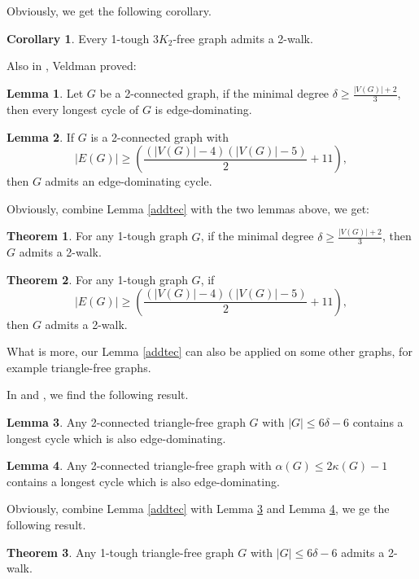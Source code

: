 \documentclass{amsart}
\theoremstyle{definition}
\newtheorem{theorem}{Theorem}
\newtheorem{corollary}{Corollary}
\newtheorem{lemma}{Lemma}
\begin{document}
Obviously, we get the following corollary.
\begin{corollary}
Every 1-tough $3K_2$-free graph admits a 2-walk.
\end{corollary}

Also in \cite{veldman83}, Veldman proved:

\begin{lemma}\label{lemdelta}{\cite[Theorem C]{veldman83}}
Let $G$ be a 2-connected graph, if the minimal degree $\delta\ge\frac{|V(G)|+2}{3}$, then every longest cycle of $G$ is edge-dominating.
\end{lemma}

\begin{lemma}\label{2conxiaoe}{\cite[Corollary 3.3.1]{veldman83}}
If $G$ is a 2-connected graph with $$|E(G)|\ge(\frac{(|V(G)|-4)(|V(G)|-5)}{2}+11),$$ then $G$ admits an edge-dominating cycle.
\end{lemma}

Obviously, combine Lemma \ref{addtec} with the two lemmas above, we get:

\begin{theorem}\label{mdeg2w}
For any 1-tough graph $G$, if the minimal degree $\delta\ge\frac{|V(G)|+2}{3}$, then $G$ admits a 2-walk.
\end{theorem}


\begin{theorem}
For any 1-tough graph $G$, if $$|E(G)|\ge(\frac{(|V(G)|-4)(|V(G)|-5)}{2}+11),$$ then $G$ admits a 2-walk.
\end{theorem}



What is more, our Lemma \ref{addtec} can also be applied on some other graphs, for example triangle-free graphs.

In \cite{aung1989longest} and \cite{ozeki2011dominating}, we find the following result.
\begin{lemma}\cite[Corollary 1.4]{aung1989longest}\label{lm89tr}
Any 2-connected triangle-free graph $G$ with $|G|\le6\delta-6$ contains a longest cycle which is also edge-dominating.
\end{lemma}

\begin{lemma}\cite[Theorem 6]{ozeki2011dominating}\label{lm11tr}
Any 2-connected triangle-free graph with $\alpha(G)\le2\kappa(G)-1$ contains a longest cycle which is also edge-dominating.
\end{lemma}

Obviously, combine Lemma \ref{addtec} with Lemma \ref{lm89tr} and Lemma \ref{lm11tr}, we ge the following result.
\begin{theorem}
Any 1-tough triangle-free graph $G$ with  $|G|\le6\delta-6$ admits a 2-walk.
\end{theorem}
\end{document}

